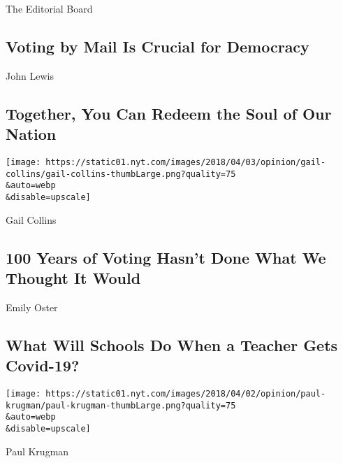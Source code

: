The Editorial Board

\hypertarget{voting-by-mail-is-crucial-for-democracy}{%
\subsection{Voting by Mail Is Crucial for
Democracy}\label{voting-by-mail-is-crucial-for-democracy}}

\href{/2020/07/30/opinion/john-lewis-civil-rights-america.html}{}

John Lewis

\hypertarget{together-you-can-redeem-the-soul-of-our-nation}{%
\subsection{Together, You Can Redeem the Soul of Our
Nation}\label{together-you-can-redeem-the-soul-of-our-nation}}

\href{/2020/07/30/opinion/sunday/19th-amendment-women-suffrage.html}{}

\texttt{[image: https://static01.nyt.com/images/2018/04/03/opinion/gail-collins/gail-collins-thumbLarge.png?quality=75\\\&auto=webp\\\&disable=upscale]}

Gail Collins

\hypertarget{100-years-of-voting-hasnt-done-what-we-thought-it-would}{%
\subsection{100 Years of Voting Hasn't Done What We Thought It
Would}\label{100-years-of-voting-hasnt-done-what-we-thought-it-would}}

\href{/2020/07/28/opinion/coronavirus-schools-reopening.html}{}

Emily Oster

\hypertarget{what-will-schools-do-when-a-teacher-gets-covid-19}{%
\subsection{What Will Schools Do When a Teacher Gets
Covid-19?}\label{what-will-schools-do-when-a-teacher-gets-covid-19}}

\href{/2020/07/27/opinion/us-republicans-coronavirus.html}{}

\texttt{[image: https://static01.nyt.com/images/2018/04/02/opinion/paul-krugman/paul-krugman-thumbLarge.png?quality=75\\\&auto=webp\\\&disable=upscale]}

Paul Krugman

